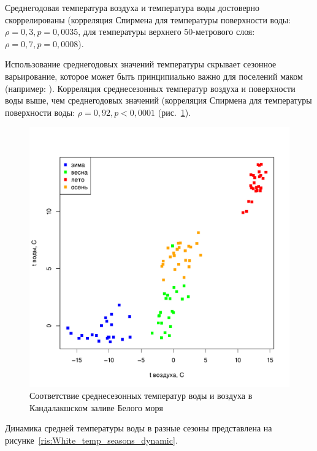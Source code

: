Среднегодовая температура воздуха и температура воды достоверно скоррелированы (корреляция Спирмена для температуры поверхности воды: $\rho = 0,3, p = 0,0035$, для температуры верхнего 50-метрового слоя: $\rho = 0,7, p = 0,0008$).

Использование среднегодовых значений температуры скрывает сезонное варьирование, которое может быть принципиально важно для поселений маком (например: \cite{Beukema_et_al_1998, Beukema_Dekker_2003, Beukema_et_al_2009}). 
Корреляция среднесезонных температур воздуха и поверхности воды выше, чем среднегодовых значений (корреляция Спирмена для температуры поверхности воды: $\rho = 0,92, p < 0,0001$ (рис.~\ref{ris:White_temp_water_vs_air_seasons}). 
	\begin{figure}[p]
    \includegraphics[width=\textwidth]{../temperatures_water_air/temp_air_water1.pdf}
    \caption{Соответствие среднесезонных температур воды и воздуха в Кандалакшском заливе Белого моря}
    \label{ris:White_temp_water_vs_air_seasons}
	\end{figure}
Динамика средней температуры воды в разные сезоны представлена на рисунке~\ref{ris:White_temp_seasons_dynamic}.
